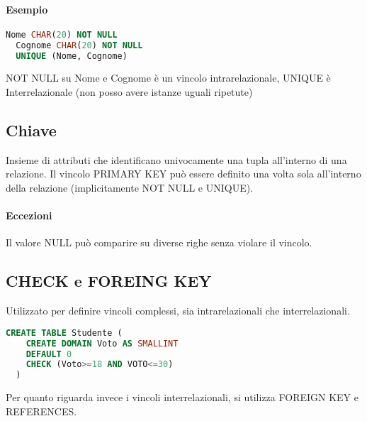 \paragraph*{Esempio}
\begin{lstlisting}[language=SQL]
  Nome CHAR(20) NOT NULL
  Cognome CHAR(20) NOT NULL 
  UNIQUE (Nome, Cognome)
\end{lstlisting}
NOT NULL su Nome e Cognome è un vincolo intrarelazionale,
UNIQUE è Interrelazionale (non posso avere istanze uguali ripetute)
\subsection{Chiave}
Insieme di attributi che identificano univocamente una tupla all'interno di
una relazione. Il vincolo PRIMARY KEY può essere definito una volta sola all'interno
della relazione (implicitamente NOT NULL e UNIQUE).
\paragraph*{Eccezioni} Il valore NULL può comparire su diverse righe senza violare
il vincolo.
\subsection*{CHECK e FOREING KEY}
Utilizzato per definire vincoli complessi, sia intrarelazionali che interrelazionali.
\begin{lstlisting}[language=SQL]
  CREATE TABLE Studente (
    CREATE DOMAIN Voto AS SMALLINT
    DEFAULT 0
    CHECK (Voto>=18 AND VOTO<=30)
  )
\end{lstlisting}
Per quanto riguarda invece i vincoli interrelazionali, si utilizza FOREIGN KEY e
REFERENCES.